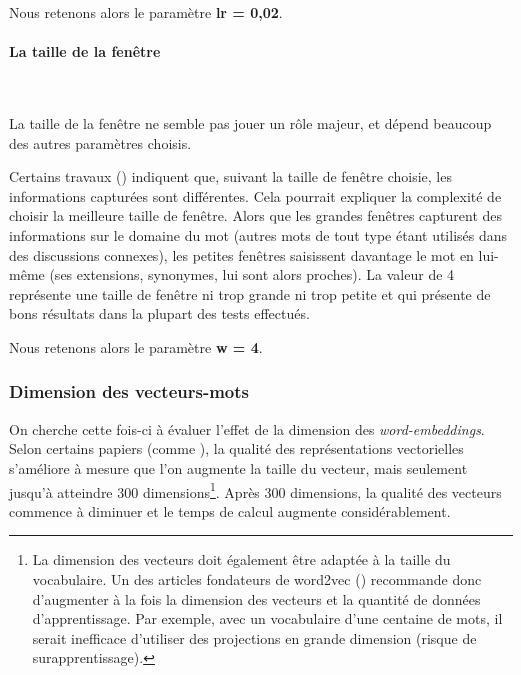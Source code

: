\documentclass[11pt,french,french]{article}
\let\rmarkdownfootnote\footnote%
\def\footnote{\protect\rmarkdownfootnote}
\begin{document}
\faArrowCircleRight{} Nous retenons alors le paramètre \textbf{lr =
0,02}.

\paragraph{La taille de la fenêtre}\label{la-taille-de-la-fenuxeatre}

~

La taille de la fenêtre ne semble pas jouer un rôle majeur, et dépend
beaucoup des autres paramètres choisis.

Certains travaux (\cite{Levy2}) indiquent que, suivant la taille de
fenêtre choisie, les informations capturées sont différentes. Cela
pourrait expliquer la complexité de choisir la \og meilleure \fg{}
taille de fenêtre. Alors que les \og grandes \fg{} fenêtres capturent
des informations sur le domaine du mot (autres mots de tout type étant
utilisés dans des discussions connexes), les \og petites \fg{} fenêtres
saisissent davantage le mot en lui-même (ses extensions, synonymes, lui
sont alors proches). La valeur de 4 représente une taille de fenêtre
\og ni trop grande ni trop petite\fg{} et qui présente de bons résultats
dans la plupart des tests effectués.

\faArrowCircleRight{} Nous retenons alors le paramètre \textbf{w = 4}.

\subsubsection{Dimension des
vecteurs-mots}\label{dimension-des-vecteurs-mots}

On cherche cette fois-ci à évaluer l'effet de la dimension des
\emph{word-embeddings}. Selon certains papiers (comme
\cite{Pennington}), la qualité des représentations vectorielles
s'améliore à mesure que l'on augmente la taille du vecteur, mais
seulement jusqu'à atteindre 300 dimensions\footnote{La dimension des
  vecteurs doit également être adaptée à la taille du vocabulaire. Un
  des articles fondateurs de word2vec (\cite{Mikolov}) recommande donc
  d'augmenter à la fois la dimension des vecteurs et la quantité de
  données d'apprentissage. Par exemple, avec un vocabulaire d'une
  centaine de mots, il serait inefficace d'utiliser des projections en
  grande dimension (risque de surapprentissage).}. Après 300 dimensions,
la qualité des vecteurs commence à diminuer et le temps de calcul
augmente considérablement.
\end{document}
